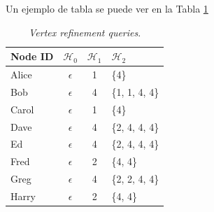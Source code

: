 Un ejemplo de tabla se puede ver en la Tabla \ref{table:ejemplo_vertex_refi_query}

\begin{table}
	\centering{}
	\begin{tabular}{ l || c | c | l }
		\hline
		Node ID & $\mathcal{H}_{0}$ & $\mathcal{H}_{1}$ & $\mathcal{H}_{2}$ \\
		\hline
		\hline
		Alice & $\epsilon$ & 1 & \{4\}  \\
		\hline
		Bob & $\epsilon$ & 4 & \{1, 1, 4, 4\}  \\
		\hline
		Carol & $\epsilon$ & 1 & \{4\}  \\
		\hline
		Dave & $\epsilon$ & 4 & \{2, 4, 4, 4\}  \\
		\hline
		Ed & $\epsilon$ & 4 & \{2, 4, 4, 4\}  \\
		\hline
		Fred & $\epsilon$ & 2 & \{4, 4\}  \\
		\hline
		Greg & $\epsilon$ & 4 & \{2, 2, 4, 4\}  \\
		\hline
		Harry & $\epsilon$ & 2 & \{4, 4\}  \\
		\hline
	\end{tabular}
	\caption{\textit{Vertex refinement queries}.}
	\label{table:ejemplo_vertex_refi_query}
\end{table}